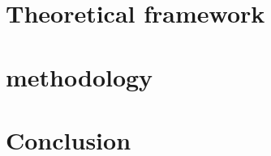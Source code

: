 \documentclass[10pt]{beamer}
\newenvironment{tres important}[2][]{
	\setkeys{EmphEqEnv}{#2}
	\setkeys{EmphEqOpt}{box={\setlength{\fboxsep}{10pt}\fcolorbox{myNewColorA}{white}},#1}
	\EmphEqMainEnv}
{\endEmphEqMainEnv}
\begin{document}
    \section{Theoretical framework}

    \section{methodology}

    \section{Conclusion}
\end{document}
